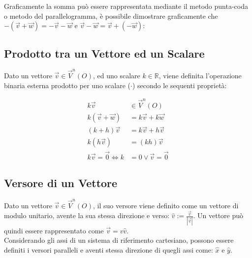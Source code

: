 \documentclass{article}
\numberwithin{equation}{subsection}
\begin{document}
Graficamente la somma può essere rappresentata mediante il 
metodo punta-coda o metodo del parallelogramma, è
possibile dimostrare graficamente che 
$-\left(\vec{v} + \vec{w}\right) = -\vec{v} -\vec{w}$ e
$ \vec{v} - \vec{w} = \vec{v} + \left(-\vec{w}\right)$:

\begin{center}\end{center}

\subsection{Prodotto tra un Vettore ed un Scalare}
Dato un vettore $\vec{v}\in\vec{V}^{n}{\left(O\right)}$, ed uno scalare $k\in\mathbb{R}$, viene definita l'operazione binaria esterna prodotto per uno scalare ($\cdot$) secondo le sequenti proprietà:

\begin{align*}
    k\vec{v} &\in\vec{V}^{n}{\left(O\right)}\\
    k\left(\vec{v} +\vec{w}\right)&= k\vec{v} + k\vec{w}\\
    \left(k + h\right)\vec{v} &= k\vec{v} + h\vec{v}\\
    k\left(h\vec{v}\right) &= \left(kh\right)\vec{v}\\
    k\vec{v} = \vec{0} \iff k &= 0 \lor \vec{v} = \vec{0}
\end{align*}

\subsection{Versore di un Vettore}

Dato un vettore $\vec{v}\in\vec{V}^{n}{\left(O\right)}$, il suo versore viene definito come un vettore di modulo unitario, avente la sua stessa direzione e verso: 
$\hat{v} := \frac{\displaystyle\vec{v}}{\displaystyle|\vec{v}|}$. 
Un vettore può quindi essere rappresentato come $\vec{v} = v\hat{v}$.\\
Considerando gli assi di un sistema di riferimento cartesiano, possono essere definiti i versori paralleli e aventi stessa direzione di quegli assi come: $\hat{x}$ e $\hat{y}$.
\end{document}
